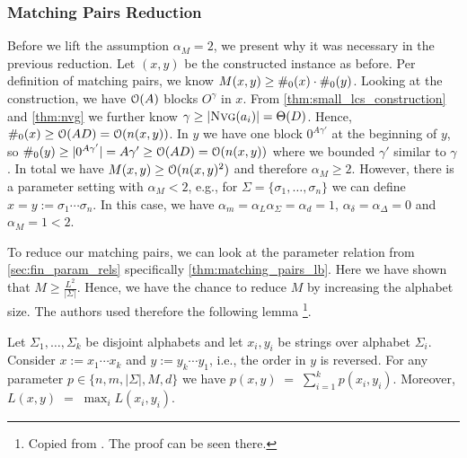 \subsubsection{Matching Pairs Reduction}

Before we lift the assumption $\alpha_M = 2$, we present why it was necessary in the previous reduction.
Let $(x,y)$ be the constructed \lcs{} instance as before.
Per definition of matching pairs, we know $M(x,y) \geq \#_{0}(x) \cdot \#_{0}(y)$.
Looking at the construction, we have $\mathcal{O}(A)$ blocks $O^\gamma$ in $x$.
From \autoref{thm:small_lcs_construction} and \autoref{thm:nvg} we further know $\gamma \geq |\text{\textsc{Nvg}}(a_i)| = \Theta(D)$. 
Hence, $\#_{0}(x) \geq \mathcal{O}(AD) = \mathcal{O}(n(x,y))$.
In $y$ we have one block $0^{A\gamma'}$ at the beginning of $y$, so $\#_{0}(y) \geq |0^{A\gamma'}| = A\gamma' \geq \mathcal{O}(AD) = \mathcal{O}(n(x,y))$ where we bounded $\gamma'$ similar to $\gamma$.
In total we have $M(x,y) \geq \mathcal{O}(n(x,y)^2)$ and therefore $\alpha_M \geq 2$.
However, there is a parameter setting with $\alpha_M < 2$, e.g., for $\Sigma = \{ \sigma_1, \ldots, \sigma_n \}$ we can define $x = y := \sigma_1 \cdots \sigma_n$.
In this case, we have $\alpha_m = \alpha_L \alpha_\Sigma = \alpha_d = 1$, $\alpha_\delta = \alpha_\Delta = 0$ and $\alpha_M = 1 < 2$.


To reduce our matching pairs, we can look at the parameter relation from \autoref{sec:fin_param_rels} specifically \autoref{thm:matching_pairs_lb}.
Here we have shown that $M \geq \frac{L^2}{|\Sigma|}$.
Hence, we have the chance to reduce $M$ by increasing the alphabet size.
The authors used therefore the following lemma
\footnote{Copied from \cite[Lemma 9.3]{Bringman.2018}. The proof can be seen there.}.

\begin{lemma}
Let $\Sigma_1,\ldots,\Sigma_k$ be disjoint alphabets and let $x_i,y_i$ be strings
over alphabet $\Sigma_i$. Consider $x := x_1 \cdots x_k$ and $y := y_k \cdots y_1$,
i.e., the order in $y$ is reversed. For any parameter $p \in \{n,m,|\Sigma|,M,d\}$
we have
\(
  p(x,y) \;=\; \sum_{i=1}^k p(x_i,y_i).
\)
Moreover,
\(
  L(x,y) \;=\; \max_i L(x_i,y_i).
\)
\end{lemma}
